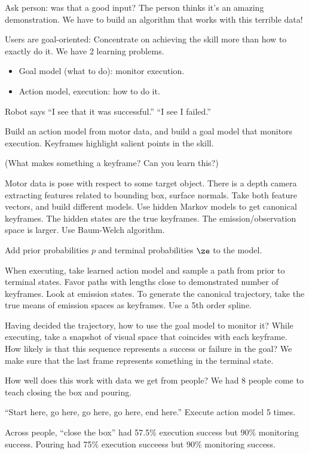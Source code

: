 Ask person: was that a good input? The person thinks it's an amazing demonstration. We have to build an algorithm that works with this terrible data!

Users are goal-oriented: Concentrate on achieving the skill more than how to exactly do it. We have 2 learning problems.
\begin{itemize}
\item
Goal model (what to do): monitor execution.
\item
Action model, execution: how to do it.
\end{itemize}
Robot says ``I see that it was successful.'' ``I see I failed.''

Build an action model from motor data, and build a goal model that monitors execution. Keyframes highlight salient points in the skill.

(What makes something a keyframe? Can you learn this?)

Motor data is pose with respect to some target object. There is a depth camera extracting features related to bounding box, surface normals. Take both feature vectors, and build different models. Use hidden Markov models to get canonical keyframes. The hidden states are the true keyframes.
The emission/observation space is larger. Use Baum-Welch algorithm.

Add prior probabilities $p$ and terminal probabilities $\ze$ to the model. 

When executing, take learned action model and sample a path from prior to terminal states. Favor paths with lengths close to demonstrated number of keyframes. Look at emission states. To generate the canonical trajectory, take the true means of emission spaces as keyframes. Use a 5th order spline. 

Having decided the trajectory, how to use the goal model to monitor it? While executing, take a snapshot of visual space that coincides with each keyframe. How likely is that this sequence represents a success or failure in the goal? We make sure that the last frame represents something in the terminal state.

How well does this work with data we get from people? We had 8 people come to teach closing the box and pouring.

``Start here, go here, go here, go here, end here.''
Execute action model 5 times. 

Across people, ``close the box'' had 57.5\% execution success but 90\% monitoring success. Pouring had 75\% execution succeess but 90\% monitoring success.

